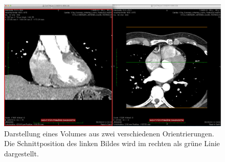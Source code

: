 \begin{figure}[t]
	\centering
	\includegraphics[width=0.8\linewidth]{img/c2_osirix_2d_view_splitscreen.jpg}
	\caption{Darstellung eines Volumes aus zwei verschiedenen Orientrierungen. Die Schnittposition des linken Bildes wird im rechten als grüne Linie dargestellt.}
	\label{fig:osirix_2dView_splitWindow}
\end{figure}

